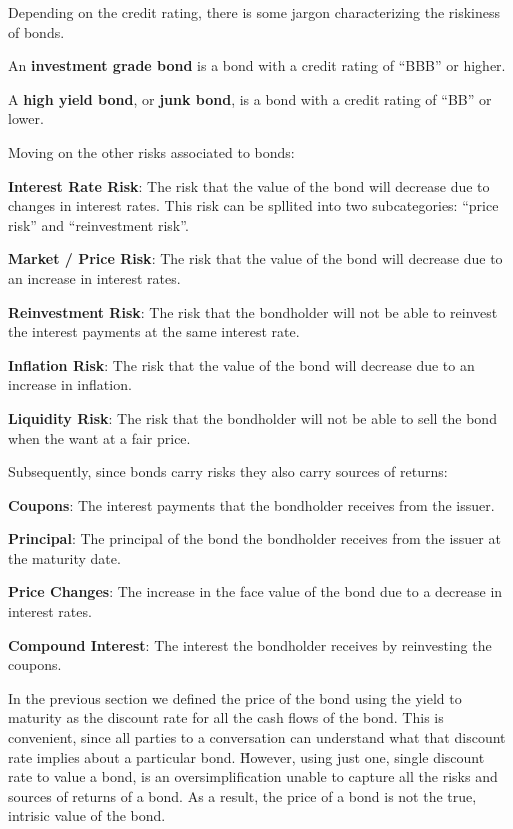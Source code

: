 Depending on the credit rating, there is some jargon characterizing the riskiness of bonds.

An \textbf{investment grade bond} is a bond with a credit rating of ``BBB'' or higher.
\ed

A \textbf{high yield bond}, or \textbf{junk bond}, is a bond with a credit rating of ``BB'' or lower.
\ed

Moving on the other risks associated to bonds:
\bit
\item \textbf{Interest Rate Risk}: The risk that the value of the bond will decrease due to changes in interest rates.
This risk can be spllited into two subcategories: ``price risk'' and ``reinvestment risk''.
\bit
\item \textbf{Market / Price Risk}: The risk that the value of the bond will decrease due to an increase in interest
rates.
\item \textbf{Reinvestment Risk}: The risk that the bondholder will not be able to reinvest the interest payments at
the same interest rate.
\eit
\item \textbf{Inflation Risk}: The risk that the value of the bond will decrease due to an increase in inflation.
\item \textbf{Liquidity Risk}: The risk that the bondholder will not be able to sell the bond when the want at a fair
price.
\eit

Subsequently, since bonds carry risks they also carry sources of returns:
\bit
\item \textbf{Coupons}: The interest payments that the bondholder receives from the issuer.
\item \textbf{Principal}: The principal of the bond the bondholder receives from the issuer at the maturity date.
\item \textbf{Price Changes}: The increase in the face value of the bond due to a decrease in interest rates.
\item \textbf{Compound Interest}: The interest the bondholder receives by reinvesting the coupons.
\eit

In the previous section we defined the price of the bond using the yield to maturity as the discount rate for all the
cash flows of the bond. This is convenient, since all parties to a conversation can understand what that discount rate
implies about a particular bond. \v

However, using just one, single discount rate to value a bond, is an oversimplification unable to capture all the
risks and sources of returns of a bond. As a result, the price of a bond is not the true, intrisic value of the bond.

